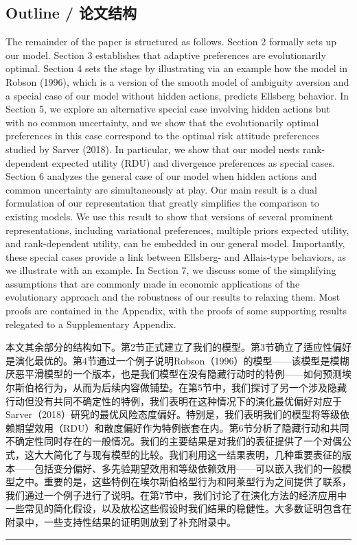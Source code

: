 \documentclass[12pt,a4paper]{article}
\newenvironment{original}
  {\par\noindent\color{black}\smallskip}
  {\par\smallskip}
\newenvironment{translation}
  {\par\noindent\color{blue!70!black}\smallskip}
  {\par\medskip\hrule\medskip}
\begin{document}
\subsection{Outline / 论文结构}

\begin{original}
The remainder of the paper is structured as follows. Section 2 formally sets up our model. Section 3 establishes that adaptive preferences are evolutionarily optimal. Section 4 sets the stage by illustrating via an example how the model in Robson (1996), which is a version of the smooth model of ambiguity aversion and a special case of our model without hidden actions, predicts Ellsberg behavior. In Section 5, we explore an alternative special case involving hidden actions but with no common uncertainty, and we show that the evolutionarily optimal preferences in this case correspond to the optimal risk attitude preferences studied by Sarver (2018). In particular, we show that our model nests rank-dependent expected utility (RDU) and divergence preferences as special cases. Section 6 analyzes the general case of our model when hidden actions and common uncertainty are simultaneously at play. Our main result is a dual formulation of our representation that greatly simplifies the comparison to existing models. We use this result to show that versions of several prominent representations, including variational preferences, multiple priors expected utility, and rank-dependent utility, can be embedded in our general model. Importantly, these special cases provide a link between Ellsberg- and Allais-type behaviors, as we illustrate with an example. In Section 7, we discuss some of the simplifying assumptions that are commonly made in economic applications of the evolutionary approach and the robustness of our results to relaxing them. Most proofs are contained in the Appendix, with the proofs of some supporting results relegated to a Supplementary Appendix.
\end{original}
\begin{translation}
本文其余部分的结构如下。第2节正式建立了我们的模型。第3节确立了适应性偏好是演化最优的。第4节通过一个例子说明Robson（1996）的模型——该模型是模糊厌恶平滑模型的一个版本，也是我们模型在没有隐藏行动时的特例——如何预测埃尔斯伯格行为，从而为后续内容做铺垫。在第5节中，我们探讨了另一个涉及隐藏行动但没有共同不确定性的特例，我们表明在这种情况下的演化最优偏好对应于Sarver（2018）研究的最优风险态度偏好。特别是，我们表明我们的模型将等级依赖期望效用（RDU）和散度偏好作为特例嵌套在内。第6节分析了隐藏行动和共同不确定性同时存在的一般情况。我们的主要结果是对我们的表征提供了一个对偶公式，这大大简化了与现有模型的比较。我们利用这一结果表明，几种重要表征的版本——包括变分偏好、多先验期望效用和等级依赖效用——可以嵌入我们的一般模型之中。重要的是，这些特例在埃尔斯伯格型行为和阿莱型行为之间提供了联系，我们通过一个例子进行了说明。在第7节中，我们讨论了在演化方法的经济应用中一些常见的简化假设，以及放松这些假设时我们结果的稳健性。大多数证明包含在附录中，一些支持性结果的证明则放到了补充附录中。
\end{translation}
\end{document}
